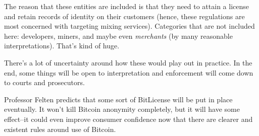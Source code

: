 \documentclass[12pt]{article}
\begin{document}
The reason that these entities are included is that they need to attain a license and retain records of identity on their customers (hence, these regulations are most concerned with targeting mixing services). Categories that are not included here: developers, miners, and maybe even \textit{merchants} (by many reasonable interpretations). That's kind of huge.

There's a lot of uncertainty around how these would play out in practice. In the end, some things will be open to interpretation and enforcement will come down to courts and prosecutors.

Professor Felten predicts that some sort of BitLicense will be put in place eventually. It won't kill Bitcoin anonymity completely, but it will have some effect--it could even improve consumer confidence now that there are clearer and existent rules around use of Bitcoin.
\end{document}
